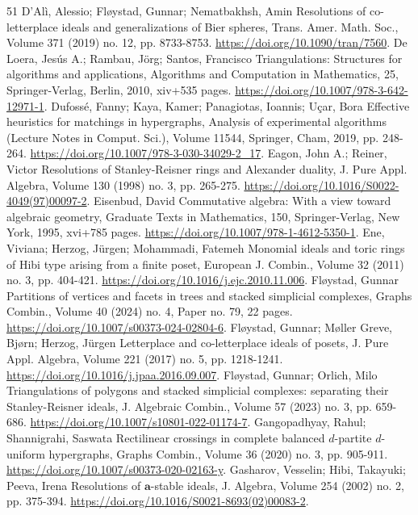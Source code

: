 \begin{thebibliography}{51}
 D’Alì, Alessio; Fløystad, Gunnar; Nematbakhsh, Amin Resolutions of co-letterplace ideals and generalizations of Bier spheres, Trans. Amer. Math. Soc., Volume 371 (2019) no. 12, pp. 8733-8753. \url{https://doi.org/10.1090/tran/7560}.
 De Loera, Jesús A.; Rambau, Jörg; Santos, Francisco Triangulations: Structures for algorithms and applications, Algorithms and Computation in Mathematics, 25, Springer-Verlag, Berlin, 2010, xiv+535 pages. \url{https://doi.org/10.1007/978-3-642-12971-1}.
 Dufossé, Fanny; Kaya, Kamer; Panagiotas, Ioannis; Uçar, Bora Effective heuristics for matchings in hypergraphs, Analysis of experimental algorithms (Lecture Notes in Comput. Sci.), Volume 11544, Springer, Cham, 2019, pp. 248-264. \url{https://doi.org/10.1007/978-3-030-34029-2_17}.
 Eagon, John A.; Reiner, Victor Resolutions of Stanley-Reisner rings and Alexander duality, J. Pure Appl. Algebra, Volume 130 (1998) no. 3, pp. 265-275. \url{https://doi.org/10.1016/S0022-4049(97)00097-2}.
 Eisenbud, David Commutative algebra: With a view toward algebraic geometry, Graduate Texts in Mathematics, 150, Springer-Verlag, New York, 1995, xvi+785 pages. \url{https://doi.org/10.1007/978-1-4612-5350-1}.
 Ene, Viviana; Herzog, Jürgen; Mohammadi, Fatemeh Monomial ideals and toric rings of Hibi type arising from a finite poset, European J. Combin., Volume 32 (2011) no. 3, pp. 404-421. \url{https://doi.org/10.1016/j.ejc.2010.11.006}.
 Fløystad, Gunnar Partitions of vertices and facets in trees and stacked simplicial complexes, Graphs Combin., Volume 40 (2024) no. 4, Paper no. 79, 22 pages. \url{https://doi.org/10.1007/s00373-024-02804-6}.
 Fløystad, Gunnar; Møller Greve, Bjørn; Herzog, Jürgen Letterplace and co-letterplace ideals of posets, J. Pure Appl. Algebra, Volume 221 (2017) no. 5, pp. 1218-1241. \url{https://doi.org/10.1016/j.jpaa.2016.09.007}.
 Fløystad, Gunnar; Orlich, Milo Triangulations of polygons and stacked simplicial complexes: separating their Stanley-Reisner ideals, J. Algebraic Combin., Volume 57 (2023) no. 3, pp. 659-686. \url{https://doi.org/10.1007/s10801-022-01174-7}.
 Gangopadhyay, Rahul; Shannigrahi, Saswata Rectilinear crossings in complete balanced $d$-partite $d$-uniform hypergraphs, Graphs Combin., Volume 36 (2020) no. 3, pp. 905-911. \url{https://doi.org/10.1007/s00373-020-02163-y}.
 Gasharov, Vesselin; Hibi, Takayuki; Peeva, Irena Resolutions of $\mathbf{a}$-stable ideals, J. Algebra, Volume 254 (2002) no. 2, pp. 375-394. \url{https://doi.org/10.1016/S0021-8693(02)00083-2}.

\end{thebibliography}
